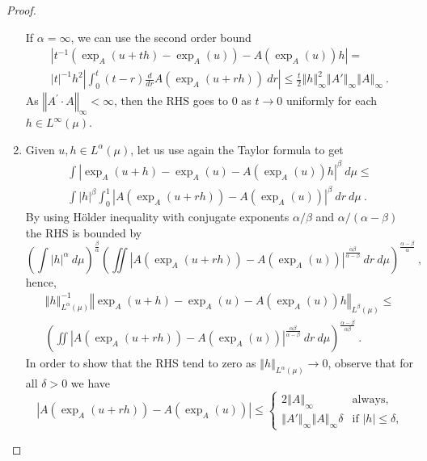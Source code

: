\documentclass[graybox]{svmult}
\newcommand{\normat}[2]{\left\Vert#2\right\Vert_{#1}}
\begin{document}
\begin{proof}
\begin{enumerate}
If $\alpha =\infty $, we can use the second order bound 
\begin{multline*}
\left\vert t^{-1}\left( \exp _{A}(u+th)-\exp _{A}(u)\right) -A(\exp
_{A}(u))h\right\vert = \\
\vert t \vert^{-1}h^{2}\left\vert \int_{0}^{t}(t-r)\frac{d}{dr}A(\exp _{A}(u+rh))\
dr\right\vert \leq \frac{t}{2}\left\Vert h\right\Vert _{\infty
}^{2} \normat \infty {A'} \normat \infty A \ .
\end{multline*}
As $\left\Vert A^{\prime }\cdot A\right\Vert _{\infty }<\infty $, then the
RHS goes to 0 as $t\rightarrow 0$ uniformly for each $h\in L^{\infty }(\mu )$.
%
\item Given $u,h\in L^{\alpha }(\mu )$, let us use again the Taylor
formula to get 
\begin{multline*}
\int \left\vert \exp _{A}(u+h)-\exp _{A}(u)-A(\exp _{A}(u))h\right\vert
^{\beta }\ d\mu \leq \\
\int \left\vert h\right\vert ^{\beta }\int_{0}^{1}\left\vert A(\exp
_{A}(u+rh))-A(\exp _{A}(u))\right\vert ^{\beta }\ dr\ d\mu \ .
\end{multline*}
By using H\"{o}lder inequality with conjugate exponents $\alpha /\beta $ and 
$\alpha /(\alpha -\beta )$ the RHS is bounded by 
\begin{equation*}
\left( \int \left\vert h\right\vert ^{\alpha }\ d\mu \right) ^{\frac{\beta }{\alpha }}
\left( \iint \left\vert A(\exp _{A}(u+rh))-A(\exp _{A}(u))\right\vert ^{\frac{\alpha \beta }{\alpha -\beta }}\ dr\ d\mu\right) ^{\frac{\alpha -\beta 
}{\alpha }}\ ,
\end{equation*}
hence, 
\begin{multline*}
\left\Vert h\right\Vert _{L^{\alpha }(\mu )}^{-1}\left\Vert \exp
_{A}(u+h)-\exp _{A}(u)-A(\exp _{A}(u))h\right\Vert _{L^{\beta }(\mu )}\leq \\
\left( \iint \left\vert A(\exp _{A}(u+rh))-A(\exp _{A}(u))\right\vert ^{\frac{\alpha \beta }{\alpha -\beta }}\ dr\ d\mu\right) ^{\frac{\alpha -\beta 
}{\alpha \beta }}\ .
\end{multline*}
In order to show that the RHS tend to zero as $\left\Vert h\right\Vert
_{L^{\alpha }(\mu )}\rightarrow 0$, observe that for all $\delta >0$ we have 
\begin{equation*}
\left\vert A(\exp _{A}(u+rh))-A(\exp _{A}(u))\right\vert \leq 
\begin{cases}
2\left\Vert A\right\Vert _{\infty } & \text{always,} \\ 
\normat \infty {A'} \normat \infty A \delta & \text{if $\left\vert h\right\vert \leq \delta $,}

\end{cases}
\end{equation*}
\end{enumerate}
\end{proof}
\end{document}
